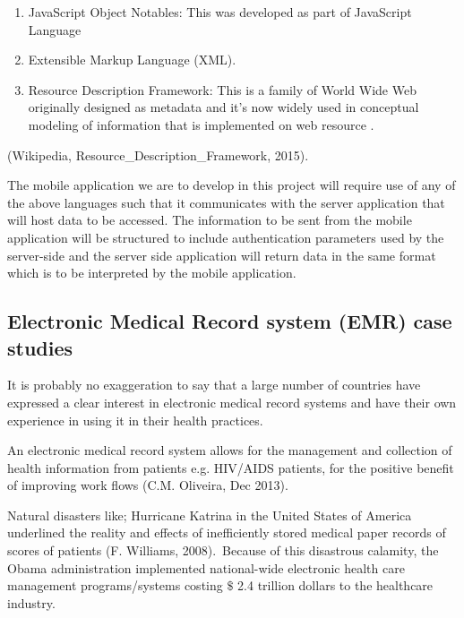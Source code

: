 \documentclass[12pt]{article}
\begin{document}
\begin{enumerate}
	\item JavaScript Object Notables: This was developed as part of JavaScript Language \par

	\item Extensible Markup Language (XML).\par

	\item  Resource Description Framework: This is a family of World Wide Web originally designed as metadata and it’s now widely used in conceptual modeling of information that is implemented on web resource .
\end{enumerate}\par

 (Wikipedia, Resource\_Description\_Framework, 2015).\  \par

The mobile application we are to develop in this project will require use of any of the above languages such that it communicates with the server application that will host data to be accessed. The information to be sent from the mobile application will be structured to include authentication parameters used by the server-side and the server side application will return data in the same format which is to be interpreted by the mobile application.\par

\setlength{\parskip}{3.0pt}
\subsection*{Electronic Medical Record system (EMR) case studies}
\setlength{\parskip}{8.04pt}
It is probably no exaggeration to say that a large number of countries have expressed a clear interest in electronic medical record systems and have their own experience in using it in their health practices.\par

An electronic medical record system allows for the management and collection of health information from patients e.g. HIV/AIDS patients, for the positive benefit of improving work flows  (C.M. Oliveira, Dec 2013). \par

Natural disasters like; Hurricane Katrina in the United States of America underlined the reality and effects of inefficiently stored medical paper records of scores of patients  (F. Williams, 2008).\  Because of this disastrous calamity, the Obama administration implemented national-wide electronic health care management programs/systems costing $\$$ 2.4 trillion dollars to the healthcare industry.\par
\end{document}
